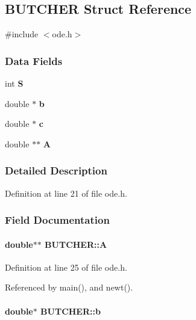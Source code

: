 \subsection{B\+U\+T\+C\+H\+E\+R Struct Reference}
\label{structBUTCHER}


{\ttfamily \#include $<$ode.\+h$>$}

\subsubsection*{Data Fields}
\begin{DoxyCompactItemize}
\item 
int {\bf S}
\item 
double $\ast$ {\bf b}
\item 
double $\ast$ {\bf c}
\item 
double $\ast$$\ast$ {\bf A}
\end{DoxyCompactItemize}


\subsubsection{Detailed Description}


Definition at line 21 of file ode.\+h.



\subsubsection{Field Documentation}
\paragraph[{A}]{\setlength{\rightskip}{0pt plus 5cm}double$\ast$$\ast$ B\+U\+T\+C\+H\+E\+R\+::\+A}\label{structBUTCHER_a4b7de674ab073c62428dffd65f15a0d2}


Definition at line 25 of file ode.\+h.



Referenced by main(), and newt().

\paragraph[{b}]{\setlength{\rightskip}{0pt plus 5cm}double$\ast$ B\+U\+T\+C\+H\+E\+R\+::b}\label{structBUTCHER_a294a17cbbdd7e1f33f2fcb7d912c1bb9}


